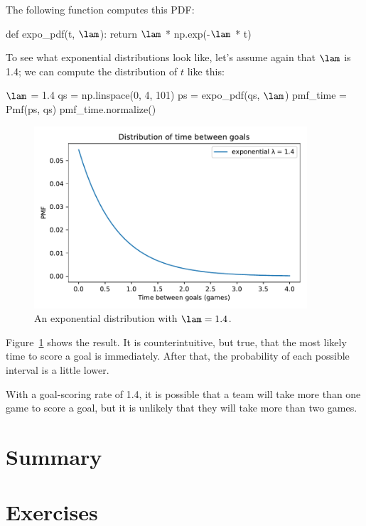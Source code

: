 \documentclass[12pt]{book}
\theoremstyle{exercise}
\begin{document}
The following function computes this PDF:

\begin{code}
def expo_pdf(t, $\lam$):
    return $\lam$ * np.exp(-$\lam$ * t)
\end{code}

To see what exponential distributions look like, let's assume again that $\lam$ is 1.4; we can compute the distribution of $t$ like this:

\begin{code}
$\lam$ = 1.4
qs = np.linspace(0, 4, 101)
ps = expo_pdf(qs, $\lam$)
pmf_time = Pmf(ps, qs)
pmf_time.normalize()
\end{code}

\begin{figure}
\centerline{\includegraphics[width=4in]{figs/fig07-05.pdf}}
\caption{An exponential distribution with $\lam = 1.4$.}
\label{fig07-05}
\end{figure}

Figure~\ref{fig07-05} shows the result.
It is counterintuitive, but true, that the most likely time to score a goal is immediately.  After that, the probability of each possible interval is a little lower.

With a goal-scoring rate of 1.4, it is possible that a team will take more than one game to score a goal, but it is unlikely that they will take more than two games.


\section{Summary}



\section{Exercises}
\end{document}
